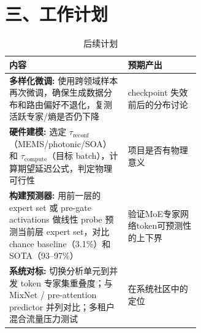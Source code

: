 \documentclass{sjtuweekly}
\begin{document}
\section{三、工作计划}

\begin{table}[H]
\centering
\small
\begin{tabularx}{\linewidth}{@{}>{\raggedright\arraybackslash}p{0.62\linewidth}>{\centering\arraybackslash}X@{}}
\toprule
\textbf{内容} & \textbf{预期产出} \\
\midrule
\textbf{多样化微调:} 使用跨领域样本再次微调，确保生成数据分布和路由偏好不退化，复测活跃专家/熵是否仍下降 & checkpoint 失效前后的分布讨论 \\
\textbf{硬件建模:} 选定 $\tau_{\text{reconf}}$（MEMS/photonic/SOA）和 $\tau_{\text{compute}}$（目标 batch），计算期望延迟公式，判定物理可行性 & 项目是否有物理意义 \\
\textbf{构建预测器:} 用前一层的 expert set 或 pre-gate activations 做线性 probe 预测当前层 expert set，对比 chance baseline（3.1\%）和 SOTA（93--97\%） & 验证MoE专家网络token可预测性的上下界 \\
\textbf{系统对标:} 切换分析单元到并发 token 专家集重叠度；与 MixNet / pre-attention predictor 并列对比；多租户混合流量压力测试 & 在系统社区中的定位 \\
\bottomrule
\end{tabularx}

\caption{后续计划}
\label{tab:plan}
\end{table}


\printbib
\end{document}
